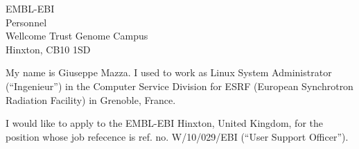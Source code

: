 \begin{letter}{EMBL-EBI \\Personnel \\Wellcome Trust Genome Campus \\Hinxton, CB10 1SD}




My name is Giuseppe Mazza. I used to work as Linux System Administrator (``Ingenieur'')
in the Computer Service Division for ESRF (European Synchrotron Radiation Facility) 
in Grenoble, France. 


I would like to apply
to the EMBL-EBI Hinxton, United Kingdom,
for the position whose job refecence is 
ref. no. W/10/029/EBI (``User Support Officer'').



\end{letter}
